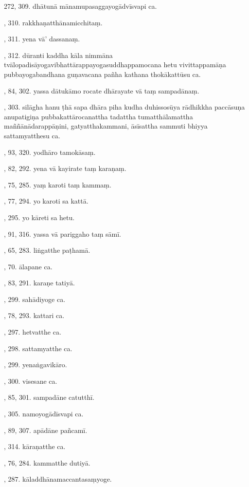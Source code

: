 272, 309. dhātunā mānamupasaggayogādvīsvapi ca.\par {}, 310. rakkhaṇatthānamicchitaṃ.\par {}, 311. yena vā’ dassanaṃ.\par {}, 312. dūranti kaddha kāla nimmāna tvālopadisāyogavibhattārappayogasuddhappamocana hetu vivittappamāṇa pubbayogabandhana guṇavacana pañha kathana thokākattūsu ca.\par {}, 84, 302. yassa dātukāmo rocate dhārayate vā taṃ sampadānaṃ.\par {}, 303. silāgha hanu ṭhā sapa dhāra piha kudha duhissosūya rādhikkha paccāsuṇa anupatigiṇa pubbakattārocanattha tadattha tumatthālamattha maññānādarappāṇini, gatyatthakammani, āsīsattha sammuti bhiyya sattamyatthesu ca.\par {}, 93, 320. yodhāro tamokāsaṃ.\par {}, 82, 292. yena vā kayirate taṃ karaṇaṃ.\par {}, 75, 285. yaṃ karoti taṃ kammaṃ.\par {}, 77, 294. yo karoti sa kattā.\par {}, 295. yo kāreti sa hetu.\par {}, 91, 316. yassa vā pariggaho taṃ sāmī.\par {}, 65, 283. liṅgatthe paṭhamā.\par {}, 70. ālapane ca.\par {}, 83, 291. karaṇe tatiyā.\par {}, 299. sahādiyoge ca.\par {}, 78, 293. kattari ca.\par {}, 297. hetvatthe ca.\par {}, 298. sattamyatthe ca.\par {}, 299. yenaṅgavikāro.\par {}, 300. visesane ca.\par {}, 85, 301. sampadāne catutthī.\par {}, 305. namoyogādīsvapi ca.\par {}, 89, 307. apādāne pañcamī.\par {}, 314. kāraṇatthe ca.\par {}, 76, 284. kammatthe dutiyā.\par {}, 287. kāladdhānamaccantasaṃyoge.\par \noindent
